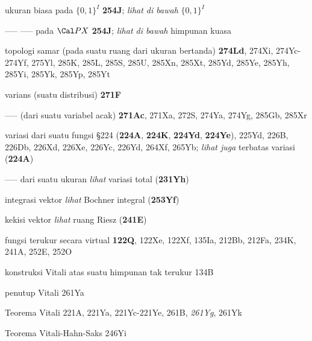 





ukuran biasa pada $\{0,1\}^I$ {\bf 254J};
  {\it lihat di bawah} $\{0,1\}^I$




----- ----- pada $\Cal PX$ {\bf 254J};  {\it lihat di bawah} himpunan kuasa





\indexmedskip

topologi samar (pada suatu ruang dari ukuran bertanda) {\bf 274Ld}, 274Xi,
274Yc-274Yf, 
275Yl, 285K, 285L, 285S, 285U, 285Xn, 285Xt, 285Yd, 285Ye, 285Yh, 285Yi,
285Yk, 285Yp, 285Yt





varians (suatu distribusi) {\bf 271F}


----- (dari suatu variabel acak) {\bf 271Ac}, 271Xa, 272S,
274Ya, 274Yg, 285Gb, 285Xr


variasi dari suatu fungsi \S224 ({\bf 224A}, {\bf 224K}, {\bf 224Yd},
{\bf 224Ye}), 225Yd, 226B, 226Db, 226Xd, 226Xe, 226Yc, 226Yd,
264Xf, 265Yb;
  {\it lihat juga} terbatas variasi ({\bf 224A})


----- dari suatu ukuran {\it lihat} variasi total ({\bf 231Yh})




integrasi vektor {\it lihat} Bochner integral ({\bf 253Yf})


kekisi vektor {\it lihat} ruang Riesz ({\bf 241E})













fungsi terukur secara virtual {\bf 122Q}, 122Xe, 122Xf, 135Ia,
  212Bb, 212Fa, 234K, 241A, 252E, 252O

konstruksi Vitali atas suatu himpunan tak terukur 134B

penutup Vitali 261Ya


Teorema Vitali 221A, 221Ya,
221Yc-221Ye, 
261B, {\it 261Yg}, 261Yk


Teorema Vitali-Hahn-Saks 246Yi




